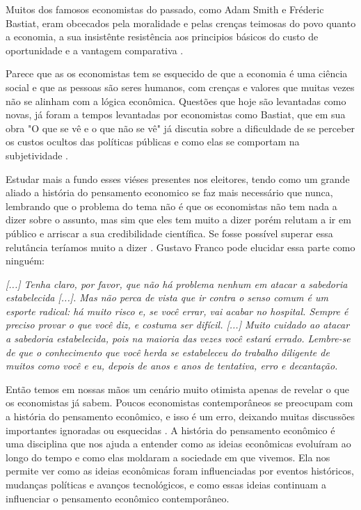 Muitos dos famosos economistas do passado, como Adam Smith e Fréderic Bastiat, eram obcecados pela moralidade e pelas crenças teimosas do povo quanto a economia,  a sua insistênte resistência  aos principios básicos do custo de oportunidade e a vantagem comparativa \cite{hart2019bastiat,Wells2013,The_Myth_of_the_Rational_Voter}.

Parece que as os economistas tem se esquecido de que a economia é uma ciência social e que as pessoas são seres humanos, com crenças e valores que muitas vezes não se alinham com a lógica econômica. Questões que hoje são levantadas como novas, já foram a tempos levantadas por economistas como Bastiat, que em sua obra "O que se vê e o que não se vê" já discutia sobre a dificuldade de se perceber os custos ocultos das políticas públicas e como elas se comportam na subjetividade \cite{hart2019bastiat}.

Estudar mais a fundo esses viéses presentes nos eleitores, tendo como um grande aliado a história do pensamento economico se faz mais necessário que nunca, lembrando que o problema do tema não é que os economistas não tem nada a dizer sobre o assunto, mas sim que eles tem muito a dizer porém relutam a ir em público e arriscar a sua credibilidade científica. Se fosse possível superar essa relutância teríamos muito a dizer \cite{The_Myth_of_the_Rational_Voter}. Gustavo Franco pode elucidar essa parte como ninguém:

\begin{citacao}
    \textit{[...] Tenha claro, por favor, que não há problema nenhum em atacar a sabedoria estabelecida [...]. Mas não perca de vista que ir contra o senso comum é um esporte radical: há muito risco e, se você errar, vai acabar no hospital. Sempre é preciso provar o que você diz, e costuma ser difícil. [...] Muito cuidado ao atacar a sabedoria estabelecida, pois na maioria das vezes você estará errado. Lembre-se de que o conhecimento que você herda se estabeleceu do trabalho diligente de muitos como você e eu, depois de anos e anos de tentativa, erro e decantação.
    }  \cite{franco2022cartas}
\end{citacao}

Então temos em nossas mãos um cenário muito otimista apenas de revelar o que os economistas já sabem. Poucos economistas contemporâneos se preocupam com a história do pensamento econômico, e isso é um erro, deixando muitas discussões importantes ignoradas ou esquecidas \cite{mark_history}. A história do pensamento econômico é uma disciplina que nos ajuda a entender como as ideias econômicas evoluíram ao longo do tempo e como elas moldaram a sociedade em que vivemos. Ela nos permite ver como as ideias econômicas foram influenciadas por eventos históricos, mudanças políticas e avanços tecnológicos, e como essas ideias continuam a influenciar o pensamento econômico contemporâneo.

